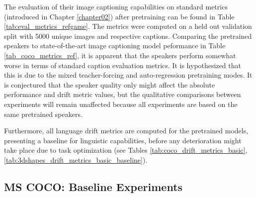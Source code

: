 The evaluation of their image captioning capabilities on standard metrics (introduced in Chapter \ref{chapter02}) after pretraining can be found in Table \ref{tab:eval_metrics_refgame}. The metrics were computed on a held out validation split with 5000 unique images and respective captions. Comparing the pretrained speakers to state-of-the-art image captioning model peformance in Table \ref{tab_coco_metrics_ref}, it is apparent that the speakers perform somewhat worse in terms of standard caption evaluation metrics. It is hypothesized that this is due to the mixed teacher-forcing and auto-regression pretraining modes. It is conjectured that the speaker quality only might affect the absolute performance and drift metric values, but the qualitative comparisons between experiments will remain unaffected because all experiments are based on the same pretrained speakers.

Furthermore, all language drift metrics are computed for the pretrained models, presenting a baseline for linguistic capabilities, before any deterioration might take place due to task optimization (see Tables \ref{tab:coco_drift_metrics_basic}, \ref{tab:3dshapes_drift_metrics_basic_baseline}).

\subsection{MS COCO: Baseline Experiments}
\label{expt:coco_baseline}

